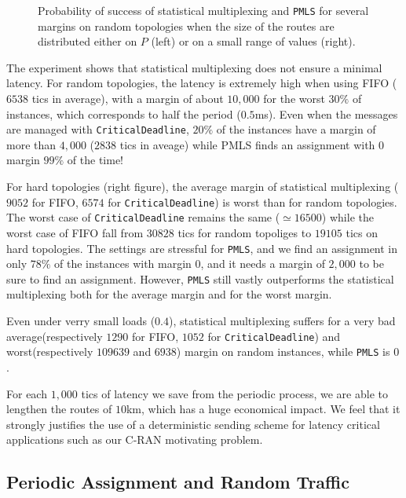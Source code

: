 \documentclass[a4paper,10pt]{journal}
\newcommand\PMLS{\texttt{PMLS}\xspace}
\newcommand\critdead{\texttt{CriticalDeadline}\xspace}
\begin{document}
\begin{figure}
\begin{minipage}{0.49\linewidth}
\begin{center}
       \end{center}
      \end{minipage}\hfill
      
      
  \caption{Probability of success of statistical multiplexing and \PMLS for several margins on random topologies when the size of the routes are distributed either on $P$ (left) or on a small range of values (right).}
      \label{fig:sto} 
      \end{figure}

   The experiment shows that statistical multiplexing does not ensure a minimal latency. 
    For random topologies, the latency is extremely high when using FIFO ($6538$ tics in average), with a margin of about $10,000$ for the worst $30\%$ of instances, which corresponds to half the period ($0.5$ms). Even when the messages are managed with \critdead, $20\%$ of the instances have a margin of more than $4,000$ ($2838$ tics in aveage) while PMLS finds an assignment with $0$ margin $99\%$ of the time! 
    
    For hard topologies (right figure), the average margin of statistical multiplexing ($9052$ for FIFO, $6574$ for \critdead) is worst than for random topologies. The worst case of \critdead  remains the same ($\simeq 16500$) while the worst case of FIFO fall from $30828$ tics for random topoliges to $19105$ tics on hard topologies. The settings are stressful for \PMLS, and we find an assignment in only $78\%$ of the instances with margin $0$, and it needs a margin of $2,000$ to be sure to find an assignment. However, \PMLS still vastly outperforms the statistical multiplexing both for the average margin and for the worst margin. 
    
    Even under verry small loads ($0.4$), statistical multiplexing suffers for a very bad average(respectively $1290$ for FIFO, $1052$ for \critdead) and worst(respectively $109639$ and $6938$) margin on random instances, while \PMLS is $0$.

    For each $1,000$ tics of latency we save from the periodic process, we are able to lengthen the routes of $10$km, which has a huge economical impact. We feel that it strongly justifies the use of a deterministic sending scheme for latency critical applications such as our C-RAN motivating problem.    
     
    \subsection{Periodic Assignment and Random Traffic}
    
\end{document}
